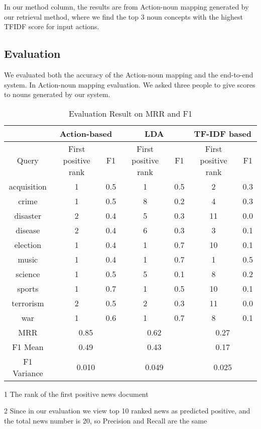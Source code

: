 In our method column, the results are from Action-noun mapping generated by
our retrieval method, where we find the top 3 noun concepts with the highest
TFIDF score for input actions.
\subsection{Evaluation}
We evaluated both the accuracy of the Action-noun mapping and the end-to-end system.
In Action-noun mapping evaluation. We asked three people to give scores to nouns generated
by our system.

\begin{table*}[th]
\centering
\caption{Evaluation Result on MRR and F1}
\begin{threeparttable}[b]
  \begin{tabular}{ c |c | c | c | c | c | c } \hline
  & \multicolumn{2}{c|}{Action-based} &  \multicolumn{2}{c|}{LDA} &  \multicolumn{2}{c}{TF-IDF based} \\
  \hline \hline
  Query & First positive rank\tnote{1} & F1\tnote{2} & First positive rank & F1 & First positive rank & F1 \\ \hline
  acquisition & 1 & 0.5 & 1 & 0.5 & 2 & 0.3 \\ \hline
  crime       & 1 & 0.5 & 8 & 0.2 & 4 & 0.3 \\ \hline
  disaster    & 2 & 0.4 & 5 & 0.3 & 11 & 0.0 \\ \hline
  disease     & 2 & 0.4 & 6 & 0.3 & 3 & 0.1 \\ \hline
  election    & 1 & 0.4 & 1 & 0.7 & 10 & 0.1 \\ \hline
  music       & 1 & 0.4 & 1 & 0.7 & 1 & 0.5 \\ \hline
  science     & 1 & 0.5 & 5 & 0.1 & 8 & 0.2 \\ \hline
  sports      & 1 & 0.7 & 1 & 0.5 & 10 & 0.1 \\ \hline
  terrorism   & 2 & 0.5 & 2 & 0.3 & 11 & 0.0 \\ \hline
  war         & 1 & 0.6 & 1 & 0.7 & 8 & 0.1 \\ \hline
  MRR         & \multicolumn{2}{c|}{0.85} & \multicolumn{2}{c|}{0.62} & \multicolumn{2}{c}{0.27} \\ \hline
  F1 Mean     & \multicolumn{2}{c|}{0.49} & \multicolumn{2}{c|}{0.43} & \multicolumn{2}{c}{0.17} \\ \hline
  F1 Variance     & \multicolumn{2}{c|}{0.010} & \multicolumn{2}{c|}{0.049} & \multicolumn{2}{c}{0.025} \\ \hline
  \end{tabular}
  \begin{tablenotes}
    \item [1] The rank of the first positive news document
    \item [2] Since in our evaluation we view top 10 ranked news as predicted positive, and the total news number is 20, so Precision and Recall are the same
    \end{tablenotes}
      \end{threeparttable}
\end{table*}


